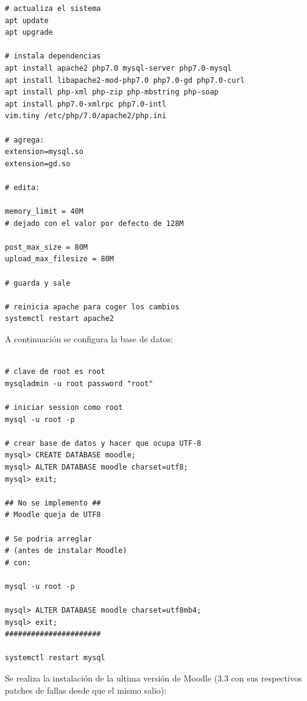 \begin{lstlisting}
# actualiza el sistema
apt update
apt upgrade

# instala dependencias
apt install apache2 php7.0 mysql-server php7.0-mysql
apt install libapache2-mod-php7.0 php7.0-gd php7.0-curl
apt install php-xml php-zip php-mbstring php-soap
apt install php7.0-xmlrpc php7.0-intl
vim.tiny /etc/php/7.0/apache2/php.ini

# agrega:
extension=mysql.so 
extension=gd.so

# edita:

memory_limit = 40M
# dejado con el valor por defecto de 128M

post_max_size = 80M
upload_max_filesize = 80M

# guarda y sale

# reinicia apache para coger los cambios
systemctl restart apache2

\end{lstlisting}

A continuación se configura la base de datos:

\begin{lstlisting}

# clave de root es root
mysqladmin -u root password "root"

# iniciar session como root
mysql -u root -p

# crear base de datos y hacer que ocupa UTF-8
mysql> CREATE DATABASE moodle;
mysql> ALTER DATABASE moodle charset=utf8;
mysql> exit;

## No se implemento ##
# Moodle queja de UTF8

# Se podria arreglar
# (antes de instalar Moodle)
# con:

mysql -u root -p

mysql> ALTER DATABASE moodle charset=utf8mb4;
mysql> exit;
######################

systemctl restart mysql

\end{lstlisting}

Se realiza la instalación de la ultima versión de Moodle (3.3 con sus respectivos patches de fallas desde que el mismo salio):

